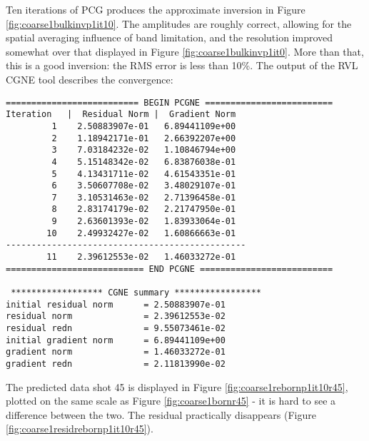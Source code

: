 
Ten iterations of PCG produces the approximate inversion in Figure
\ref{fig:coarse1bulkinvp1it10}. The amplitudes are roughly correct,
allowing for the spatial averaging influence of band limitation, and the
resolution improved somewhat over that displayed in Figure
\ref{fig:coarse1bulkinvp1it0}. More than that, this is a good
inversion: the RMS error is less than 10\%. The output of the RVL CGNE
tool describes the convergence:

\begin{verbatim}
========================== BEGIN PCGNE =========================
Iteration   |  Residual Norm |  Gradient Norm
         1    2.50883907e-01   6.89441109e+00
         2    1.18942171e-01   2.66392207e+00
         3    7.03184232e-02   1.10846794e+00
         4    5.15148342e-02   6.83876038e-01
         5    4.13431711e-02   4.61543351e-01
         6    3.50607708e-02   3.48029107e-01
         7    3.10531463e-02   2.71396458e-01
         8    2.83174179e-02   2.21747950e-01
         9    2.63601393e-02   1.83933064e-01
        10    2.49932427e-02   1.60866663e-01
-----------------------------------------------
        11    2.39612553e-02   1.46033272e-01
=========================== END PCGNE ==========================

 ****************** CGNE summary *****************  
initial residual norm      = 2.50883907e-01
residual norm              = 2.39612553e-02
residual redn              = 9.55073461e-02
initial gradient norm      = 6.89441109e+00
gradient norm              = 1.46033272e-01
gradient redn              = 2.11813990e-02
\end{verbatim}

The predicted data shot 45 is displayed in Figure
\ref{fig:coarse1rebornp1it10r45}, plotted on the same scale as Figure
\ref{fig:coarse1bornr45} - it is hard to see a difference between the
two. The residual practically disappears (Figure \ref{fig:coarse1residrebornp1it10r45}).



